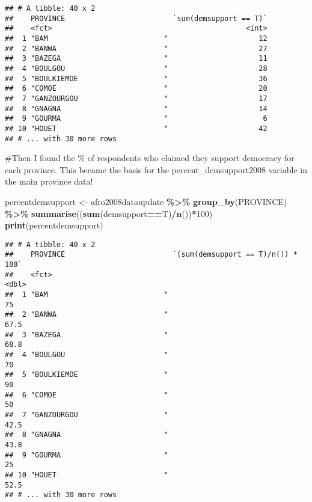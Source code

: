 \documentclass[]{article}
\newenvironment{Shaded}{\begin{snugshade}}{\end{snugshade}}
\newcommand{\DecValTok}[1]{\textcolor[rgb]{0.00,0.00,0.81}{#1}}
\newcommand{\KeywordTok}[1]{\textcolor[rgb]{0.13,0.29,0.53}{\textbf{#1}}}
\newcommand{\NormalTok}[1]{#1}
\newcommand{\OperatorTok}[1]{\textcolor[rgb]{0.81,0.36,0.00}{\textbf{#1}}}
\newcommand{\StringTok}[1]{\textcolor[rgb]{0.31,0.60,0.02}{#1}}
\begin{document}
\begin{verbatim}
## # A tibble: 40 x 2
##    PROVINCE                         `sum(demsupport == T)`
##    <fct>                                             <int>
##  1 "BAM                           "                     12
##  2 "BANWA                         "                     27
##  3 "BAZEGA                        "                     11
##  4 "BOULGOU                       "                     28
##  5 "BOULKIEMDE                    "                     36
##  6 "COMOE                         "                     20
##  7 "GANZOURGOU                    "                     17
##  8 "GNAGNA                        "                     14
##  9 "GOURMA                        "                      6
## 10 "HOUET                         "                     42
## # ... with 30 more rows
\end{verbatim}

\#Then I found the \% of respondents who claimed they support democracy
for each province. This became the basis for the percent\_demsupport2008
variable in the main province data!

\begin{Shaded}
\begin{Highlighting}[]
\NormalTok{percentdemsupport <{-}}\StringTok{ }\NormalTok{afro2008dataupdate }\OperatorTok{\%>\%}
\StringTok{  }\KeywordTok{group\_by}\NormalTok{(PROVINCE) }\OperatorTok{\%>\%}
\StringTok{  }\KeywordTok{summarise}\NormalTok{((}\KeywordTok{sum}\NormalTok{(demsupport}\OperatorTok{==}\NormalTok{T)}\OperatorTok{/}\KeywordTok{n}\NormalTok{())}\OperatorTok{*}\DecValTok{100}\NormalTok{)}
\KeywordTok{print}\NormalTok{(percentdemsupport)}
\end{Highlighting}
\end{Shaded}

\begin{verbatim}
## # A tibble: 40 x 2
##    PROVINCE                         `(sum(demsupport == T)/n()) * 100`
##    <fct>                                                         <dbl>
##  1 "BAM                           "                               75  
##  2 "BANWA                         "                               67.5
##  3 "BAZEGA                        "                               68.8
##  4 "BOULGOU                       "                               70  
##  5 "BOULKIEMDE                    "                               90  
##  6 "COMOE                         "                               50  
##  7 "GANZOURGOU                    "                               42.5
##  8 "GNAGNA                        "                               43.8
##  9 "GOURMA                        "                               25  
## 10 "HOUET                         "                               52.5
## # ... with 30 more rows
\end{verbatim}
\end{document}
